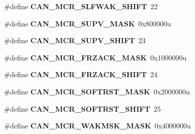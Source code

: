 \begin{DoxyCompactItemize}
\item 
\#define {\bfseries C\+A\+N\+\_\+\+M\+C\+R\+\_\+\+S\+L\+F\+W\+A\+K\+\_\+\+S\+H\+I\+FT}~22\hypertarget{group__CAN__Register__Masks_ga8dc0878396e4d4e4b73deec9cf23b0b1}{}\label{group__CAN__Register__Masks_ga8dc0878396e4d4e4b73deec9cf23b0b1}

\item 
\#define {\bfseries C\+A\+N\+\_\+\+M\+C\+R\+\_\+\+S\+U\+P\+V\+\_\+\+M\+A\+SK}~0x800000u\hypertarget{group__CAN__Register__Masks_ga00521c6adbee738b0f73380052600203}{}\label{group__CAN__Register__Masks_ga00521c6adbee738b0f73380052600203}

\item 
\#define {\bfseries C\+A\+N\+\_\+\+M\+C\+R\+\_\+\+S\+U\+P\+V\+\_\+\+S\+H\+I\+FT}~23\hypertarget{group__CAN__Register__Masks_ga5a448e496f0243c035ddcb70b8a07c4e}{}\label{group__CAN__Register__Masks_ga5a448e496f0243c035ddcb70b8a07c4e}

\item 
\#define {\bfseries C\+A\+N\+\_\+\+M\+C\+R\+\_\+\+F\+R\+Z\+A\+C\+K\+\_\+\+M\+A\+SK}~0x1000000u\hypertarget{group__CAN__Register__Masks_gabec15eb427d7b249e72902c35bfc5f6e}{}\label{group__CAN__Register__Masks_gabec15eb427d7b249e72902c35bfc5f6e}

\item 
\#define {\bfseries C\+A\+N\+\_\+\+M\+C\+R\+\_\+\+F\+R\+Z\+A\+C\+K\+\_\+\+S\+H\+I\+FT}~24\hypertarget{group__CAN__Register__Masks_ga666c7d11b911c7803d94b85ba54a05c3}{}\label{group__CAN__Register__Masks_ga666c7d11b911c7803d94b85ba54a05c3}

\item 
\#define {\bfseries C\+A\+N\+\_\+\+M\+C\+R\+\_\+\+S\+O\+F\+T\+R\+S\+T\+\_\+\+M\+A\+SK}~0x2000000u\hypertarget{group__CAN__Register__Masks_gab9b1cfdb7014655d12f0a5ebafb3fc9b}{}\label{group__CAN__Register__Masks_gab9b1cfdb7014655d12f0a5ebafb3fc9b}

\item 
\#define {\bfseries C\+A\+N\+\_\+\+M\+C\+R\+\_\+\+S\+O\+F\+T\+R\+S\+T\+\_\+\+S\+H\+I\+FT}~25\hypertarget{group__CAN__Register__Masks_gadff8b8b1d5645fca57a02109df3e507b}{}\label{group__CAN__Register__Masks_gadff8b8b1d5645fca57a02109df3e507b}

\item 
\#define {\bfseries C\+A\+N\+\_\+\+M\+C\+R\+\_\+\+W\+A\+K\+M\+S\+K\+\_\+\+M\+A\+SK}~0x4000000u\hypertarget{group__CAN__Register__Masks_gac42f66e8828cd1923fee14d23ed99986}{}\label{group__CAN__Register__Masks_gac42f66e8828cd1923fee14d23ed99986}


\end{DoxyCompactItemize}
